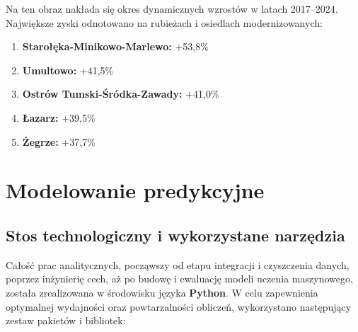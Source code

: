 \documentclass[12pt,a4paper]{article}
\begin{document}
Na ten obraz nakłada się okres dynamicznych wzrostów w latach 2017--2024. Największe zyski odnotowano na rubieżach i osiedlach modernizowanych:
\begin{enumerate}
  \item \textbf{Starołęka-Minikowo-Marlewo:} +53,8\%
  \item \textbf{Umultowo:} +41,5\%
  \item \textbf{Ostrów Tumski-Śródka-Zawady:} +41,0\%
  \item \textbf{Łazarz:} +39,5\%
  \item \textbf{Żegrze:} +37,7\%
\end{enumerate}

\section{Modelowanie predykcyjne}

\subsection{Stos technologiczny i wykorzystane narzędzia}

Całość prac analitycznych, począwszy od etapu integracji i czyszczenia danych, poprzez inżynierię cech, aż po budowę i ewaluację modeli uczenia maszynowego, została zrealizowana w środowisku języka \textbf{Python}. W celu zapewnienia optymalnej wydajności oraz powtarzalności obliczeń, wykorzystano następujący zestaw pakietów i bibliotek:
\end{document}
